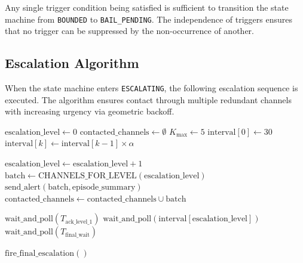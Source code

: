 \bigskip

Any single trigger condition being satisfied is sufficient to transition the state machine from \texttt{BOUNDED} to \texttt{BAIL\_PENDING}. The independence of triggers ensures that no trigger can be suppressed by the non-occurrence of another.

\bigskip

\subsection{Escalation Algorithm}
\label{sec:escalation}

When the state machine enters \texttt{ESCALATING}, the following escalation sequence is executed. The algorithm ensures contact through multiple redundant channels with increasing urgency via geometric backoff.

\begin{algorithm}
\caption{Escalation Sequence}
\label{alg:escalation}
\begin{algorithmic}[1]
\State $\text{escalation\_level} \gets 0$
\State $\text{contacted\_channels} \gets \emptyset$
\State $K_{\text{max}} \gets 5$ 
\State $\text{interval}[0] \gets 30$ 
\State $\text{interval}[k] \gets \text{interval}[k-1] \times \alpha$ 

    \State $\text{escalation\_level} \gets \text{escalation\_level} + 1$
    \State $\text{batch} \gets \text{CHANNELS\_FOR\_LEVEL}(\text{escalation\_level})$
    \State $\text{send\_alert}(\text{batch}, \text{episode\_summary})$
    \State $\text{contacted\_channels} \gets \text{contacted\_channels} \cup \text{batch}$

        \State $\text{wait\_and\_poll}(T_{\text{ack\_level\_1}})$
        \State $\text{wait\_and\_poll}(\text{interval}[\text{escalation\_level}])$
    \Else
        \State $\text{wait\_and\_poll}(T_{\text{final\_wait}})$
    \EndIf

        \State \Return {}
    \EndIf
\EndWhile

    \State $\text{fire\_final\_escalation}()$
    \State \Return {}
\EndIf
\end{algorithmic}
\end{algorithm}

